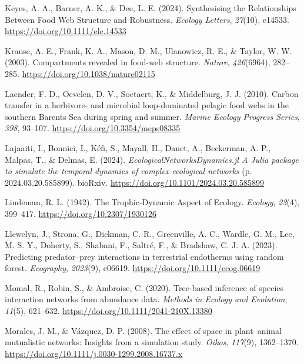 \documentclass[
]{article}
\newlength{\cslhangindent}
\newenvironment{CSLReferences}[2] %
 {\begin{list}{}{%
  \setlength{\itemindent}{0pt}
  \setlength{\leftmargin}{0pt}
  \setlength{\parsep}{0pt}
  \ifodd #1
   \setlength{\leftmargin}{\cslhangindent}
   \setlength{\itemindent}{-1\cslhangindent}
  \fi
  \setlength{\itemsep}{#2\baselineskip}}}
 {\end{list}}
\begin{document}
\begin{CSLReferences}{1}{0}
Keyes, A. A., Barner, A. K., \& Dee, L. E. (2024). Synthesising the
{Relationships Between Food Web Structure} and {Robustness}.
\emph{Ecology Letters}, \emph{27}(10), e14533.
\url{https://doi.org/10.1111/ele.14533}

Krause, A. E., Frank, K. A., Mason, D. M., Ulanowicz, R. E., \& Taylor,
W. W. (2003). Compartments revealed in food-web structure.
\emph{Nature}, \emph{426}(6964), 282--285.
\url{https://doi.org/10.1038/nature02115}

Laender, F. D., Oevelen, D. V., Soetaert, K., \& Middelburg, J. J.
(2010). Carbon transfer in a herbivore- and microbial loop-dominated
pelagic food webs in the southern {Barents Sea} during spring and
summer. \emph{Marine Ecology Progress Series}, \emph{398}, 93--107.
\url{https://doi.org/10.3354/meps08335}

Lajaaiti, I., Bonnici, I., Kéfi, S., Mayall, H., Danet, A., Beckerman,
A. P., Malpas, T., \& Delmas, E. (2024).
\emph{{EcologicalNetworksDynamics}.jl {A Julia} package to simulate the
temporal dynamics of complex ecological networks} (p.
2024.03.20.585899). bioRxiv.
\url{https://doi.org/10.1101/2024.03.20.585899}

Lindeman, R. L. (1942). The {Trophic-Dynamic Aspect} of {Ecology}.
\emph{Ecology}, \emph{23}(4), 399--417.
\url{https://doi.org/10.2307/1930126}

Llewelyn, J., Strona, G., Dickman, C. R., Greenville, A. C., Wardle, G.
M., Lee, M. S. Y., Doherty, S., Shabani, F., Saltré, F., \& Bradshaw, C.
J. A. (2023). Predicting predator--prey interactions in terrestrial
endotherms using random forest. \emph{Ecography}, \emph{2023}(9),
e06619. \url{https://doi.org/10.1111/ecog.06619}

Momal, R., Robin, S., \& Ambroise, C. (2020). Tree-based inference of
species interaction networks from abundance data. \emph{Methods in
Ecology and Evolution}, \emph{11}(5), 621--632.
\url{https://doi.org/10.1111/2041-210X.13380}

Morales, J. M., \& Vázquez, D. P. (2008). The effect of space in
plant--animal mutualistic networks: Insights from a simulation study.
\emph{Oikos}, \emph{117}(9), 1362--1370.
\url{https://doi.org/10.1111/j.0030-1299.2008.16737.x}


\end{CSLReferences}
\end{document}
